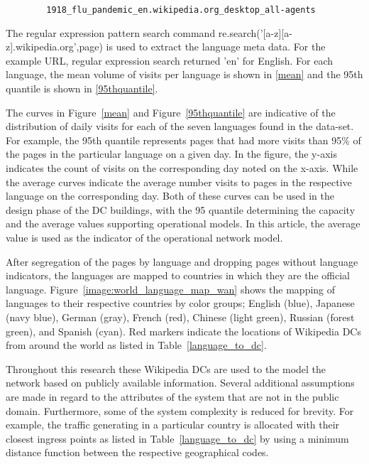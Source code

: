     \begin{verbatim}
        1918_flu_pandemic_en.wikipedia.org_desktop_all-agents
    \end{verbatim} 
    
    The regular expression pattern search command re.search('[a-z][a-z].wikipedia.org',page) is used to extract the language meta data. For the example URL, regular expression search returned 'en' for English.  For each language, the mean volume of visits per language is shown in \ref{mean} and the 95th quantile is shown in \ref{95thquantile}.  
    
    
        
    The curves in Figure~\ref{mean} and Figure~\ref{95thquantile} are indicative of the distribution of daily visits for each of the seven languages found in the data-set.  For example, the 95th quantile represents pages that had more visits than 95\% of the pages in the particular language on a given day. In the figure, the y-axis indicates the count of visits on the corresponding day noted on the x-axis. While the average curves indicate the average number visits to pages in the respective language on the corresponding day. Both of these curves can be used in the design phase of the DC buildings, with the 95 quantile determining the capacity and the average values supporting operational models. In this article, the average value is used as the indicator of the operational network model. 
    
    
    
    After segregation of the pages by language and dropping pages without language indicators, the languages are mapped to countries in which they are the official language. Figure~\ref{image:world_language_map_wan} shows the mapping of languages to their respective countries by color groups; English (blue), Japanese (navy blue), German (gray), French (red), Chinese (light green), Russian (forest green), and Spanish (cyan). Red markers indicate the locations of Wikipedia DCs from around the world as listed in Table~\ref{language_to_dc}.
    
    
    
    Throughout this research these Wikipedia DCs are used to the model the network based on publicly available information. Several additional assumptions are made in regard to the attributes of the system that are not in the public domain. Furthermore, some of the system complexity is reduced for brevity. For example, the traffic generating in a particular country is allocated with their closest ingress points as listed in Table~\ref{language_to_dc} by using a minimum distance function between the respective geographical codes. 
    

